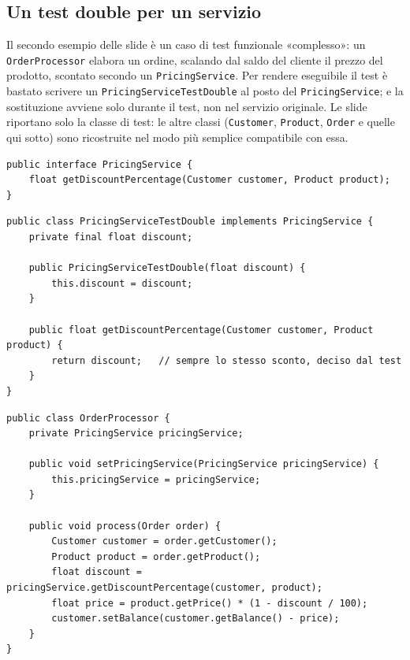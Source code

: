 \subsection{Un test double per un servizio}

Il secondo esempio delle slide è un caso di test funzionale «complesso»: un \texttt{OrderProcessor} elabora un ordine,
scalando dal saldo del cliente il prezzo del prodotto, scontato secondo un \texttt{PricingService}. Per rendere
eseguibile il test è bastato scrivere un \texttt{PricingServiceTestDouble} al posto del \texttt{PricingService}; e la
sostituzione avviene solo durante il test, non nel servizio originale. Le slide riportano solo la classe di test: le
altre classi (\texttt{Customer}, \texttt{Product}, \texttt{Order} e quelle qui sotto) sono ricostruite nel modo più
semplice compatibile con essa.

\begin{lstlisting}[style=java, name=PricingService.java]
public interface PricingService {
    float getDiscountPercentage(Customer customer, Product product);
}
\end{lstlisting}

\begin{lstlisting}[style=java, name=PricingServiceTestDouble.java]
public class PricingServiceTestDouble implements PricingService {
    private final float discount;

    public PricingServiceTestDouble(float discount) {
        this.discount = discount;
    }

    public float getDiscountPercentage(Customer customer, Product product) {
        return discount;   // sempre lo stesso sconto, deciso dal test
    }
}
\end{lstlisting}

\begin{lstlisting}[style=java, name=OrderProcessor.java]
public class OrderProcessor {
    private PricingService pricingService;

    public void setPricingService(PricingService pricingService) {
        this.pricingService = pricingService;
    }

    public void process(Order order) {
        Customer customer = order.getCustomer();
        Product product = order.getProduct();
        float discount = pricingService.getDiscountPercentage(customer, product);
        float price = product.getPrice() * (1 - discount / 100);
        customer.setBalance(customer.getBalance() - price);
    }
}
\end{lstlisting}

